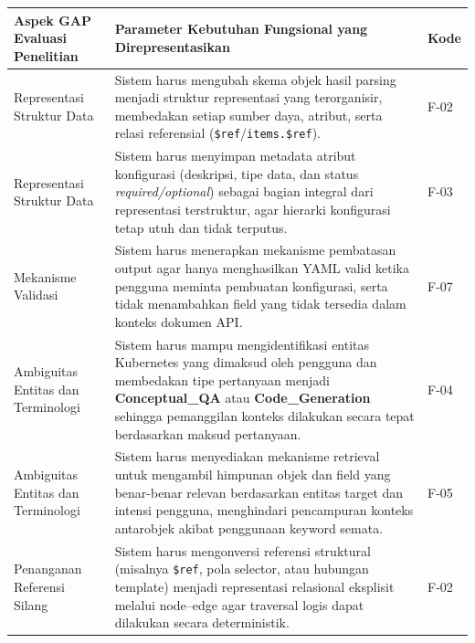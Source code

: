\captionsetup[table]{justification=raggedright,singlelinecheck=false}
\renewcommand{\arraystretch}{1.25}
\begin{table}[H]
\centering
\begin{tabular}{|p{4cm}|p{7cm}|p{2cm}|}
\hline
\textbf{Aspek GAP Evaluasi Penelitian} & 
\textbf{Parameter Kebutuhan Fungsional yang Direpresentasikan} &
\textbf{Kode} \\ \hline

Representasi Struktur Data &
Sistem harus mengubah skema objek hasil parsing menjadi struktur representasi
yang terorganisir, membedakan setiap sumber daya, atribut, serta relasi referensial
(\texttt{\$ref}/\texttt{items.\$ref}). &
F-02 \\ \hline

Representasi Struktur Data &
Sistem harus menyimpan metadata atribut konfigurasi (deskripsi, tipe data,
dan status \textit{required/optional}) sebagai bagian integral dari representasi terstruktur,
agar hierarki konfigurasi tetap utuh dan tidak terputus. &
F-03 \\ \hline

Mekanisme Validasi &
Sistem harus menerapkan mekanisme pembatasan output agar hanya menghasilkan
YAML valid ketika pengguna meminta pembuatan konfigurasi, serta tidak menambahkan
field yang tidak tersedia dalam konteks dokumen API. &
F-07 \\ \hline

Ambiguitas Entitas dan Terminologi &
Sistem harus mampu mengidentifikasi entitas Kubernetes yang dimaksud oleh pengguna
dan membedakan tipe pertanyaan menjadi \textbf{Conceptual\_QA} atau
\textbf{Code\_Generation} sehingga pemanggilan konteks dilakukan secara tepat
berdasarkan maksud pertanyaan. &
F-04 \\ \hline

Ambiguitas Entitas dan Terminologi &
Sistem harus menyediakan mekanisme retrieval untuk mengambil himpunan objek dan field
yang benar-benar relevan berdasarkan entitas target dan intensi pengguna,
menghindari pencampuran konteks antarobjek akibat penggunaan keyword semata. &
F-05 \\ \hline

Penanganan Referensi Silang &
Sistem harus mengonversi referensi struktural (misalnya \texttt{\$ref}, pola selector,
atau hubungan template) menjadi representasi relasional eksplisit melalui node–edge
agar traversal logis dapat dilakukan secara deterministik. &
F-02 \\ \hline


\end{tabular}
\end{table}
